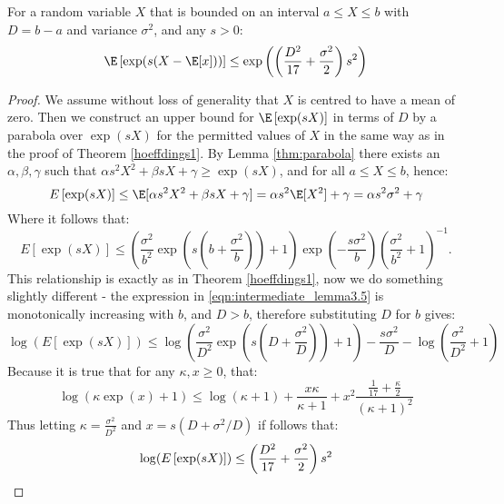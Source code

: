 \begin{lemma}\label{expectation1}
For a random variable $X$ that is bounded on an interval $a\le X\le b$ with $D=b-a$ and variance $\sigma^2$, and any $s>0$:
\[
\E\left[\exp(s(X-\E[x]))\right] 
\le\exp\left(\left(\frac{D^2}{17}+\frac{\sigma^2}{2}\right)s^2\right)
\nonumber
\]
\end{lemma}
\begin{proof}
We assume without loss of generality that $X$ is centred to have a mean of zero.
Then we construct an upper bound for $\E\left[\exp(sX)\right]$ in terms of $D$ by a parabola over $\exp(sX)$ for the permitted values of $X$ in the same way as in the proof of Theorem \ref{hoeffdings1}. By Lemma \ref{thm:parabola} there exists an $\alpha,\beta,\gamma$ such that $\alpha s^2X^2+\beta sX+\gamma\ge \exp(sX)$, and for all $a\le X\le b$, hence:
\[
E\left[\exp(sX)\right] \le \E[\alpha s^2X^2+\beta sX+\gamma] = \alpha s^2\E[X^2]+\gamma = \alpha s^2\sigma^2+\gamma
\nonumber\]
Where it follows that:
\begin{equation}\label{eqn:intermediate_lemma3.5}
E\left[\exp(sX)\right] \le\left(\frac{\sigma^2}{b^2}\exp\left(s\left(b+\frac{\sigma^2}{b}\right)\right) + 1\right)\exp\left(-\frac{s\sigma^2}{b}\right)\left(\frac{\sigma^2}{b^2} + 1\right)^{-1}.
\nonumber 
\end{equation}
This relationship is exactly as in Theorem \ref{hoeffdings1}, now we do something slightly different - the expression in \eqref{eqn:intermediate_lemma3.5} is monotonically increasing with $b$, and $D>b$, therefore substituting $D$ for $b$ gives:
\begin{equation}\label{eq:part1}
\log(E\left[\exp(sX)\right]) \le \log\left(\frac{\sigma^2}{D^2}\exp\left(s\left(D+\frac{\sigma^2}{D}\right)\right) + 1\right)-\frac{s\sigma^2}{D} - \log\left(\frac{\sigma^2}{D^2} + 1\right)
\end{equation}
Because it is true that for any $\kappa,x\ge 0$, that: 
\begin{equation}\label{eq:part2}
\log(\kappa\exp(x)+1)\le\log(\kappa+1)+\frac{x\kappa}{\kappa+1}+x^2\frac{\frac{1}{17}+\frac{\kappa}{2}}{(\kappa+1)^2}
\end{equation}
Thus letting $\kappa=\frac{\sigma^2}{D^2}$ and $x=s(D+\sigma^2/D)$ if follows that:
\begin{equation}\label{eq:part3}
\log(E\left[\exp(sX)\right]) \le \left(\frac{D^2}{17}+\frac{\sigma^2}{2}\right)s^2\qedhere
\end{equation}
\end{proof}

